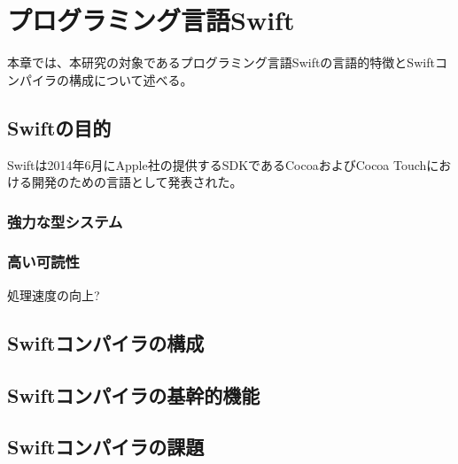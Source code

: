 \chapter{プログラミング言語Swift}
\label{explain-swift}

本章では、本研究の対象であるプログラミング言語Swiftの言語的特徴とSwiftコンパイラの構成について述べる。

\section{Swiftの目的}
\label{explain-swift:purpose}

Swiftは2014年6月にApple社の提供するSDKであるCocoaおよびCocoa Touchにおける開発のための言語として発表された。

\subsection{強力な型システム}

\subsection{高い可読性}

処理速度の向上?

\section{Swiftコンパイラの構成}
\label{explain-swift:structure}

\section{Swiftコンパイラの基幹的機能}

\section{Swiftコンパイラの課題}

